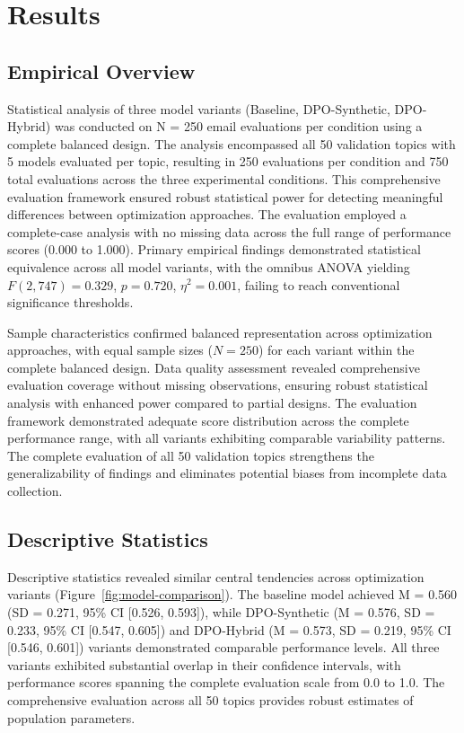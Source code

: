 \chapter{Results}

\section{Empirical Overview}
\label{sec:empirical-overview}

Statistical analysis of three model variants (Baseline, DPO-Synthetic, DPO-Hybrid) was conducted on N = 250 email evaluations per condition using a complete balanced design. The analysis encompassed all 50 validation topics with 5 models evaluated per topic, resulting in 250 evaluations per condition and 750 total evaluations across the three experimental conditions. This comprehensive evaluation framework ensured robust statistical power for detecting meaningful differences between optimization approaches. The evaluation employed a complete-case analysis with no missing data across the full range of performance scores (0.000 to 1.000). Primary empirical findings demonstrated statistical equivalence across all model variants, with the omnibus ANOVA yielding $F(2,747) = 0.329$, $p = 0.720$, $\eta^2 = 0.001$, failing to reach conventional significance thresholds.

Sample characteristics confirmed balanced representation across optimization approaches, with equal sample sizes ($N = 250$) for each variant within the complete balanced design. Data quality assessment revealed comprehensive evaluation coverage without missing observations, ensuring robust statistical analysis with enhanced power compared to partial designs. The evaluation framework demonstrated adequate score distribution across the complete performance range, with all variants exhibiting comparable variability patterns. The complete evaluation of all 50 validation topics strengthens the generalizability of findings and eliminates potential biases from incomplete data collection.

\section{Descriptive Statistics}
\label{sec:descriptive-statistics}

Descriptive statistics revealed similar central tendencies across optimization variants (Figure~\ref{fig:model-comparison}). The baseline model achieved M = 0.560 (SD = 0.271, 95\% CI [0.526, 0.593]), while DPO-Synthetic (M = 0.576, SD = 0.233, 95\% CI [0.547, 0.605]) and DPO-Hybrid (M = 0.573, SD = 0.219, 95\% CI [0.546, 0.601]) variants demonstrated comparable performance levels. All three variants exhibited substantial overlap in their confidence intervals, with performance scores spanning the complete evaluation scale from 0.0 to 1.0. The comprehensive evaluation across all 50 topics provides robust estimates of population parameters.

